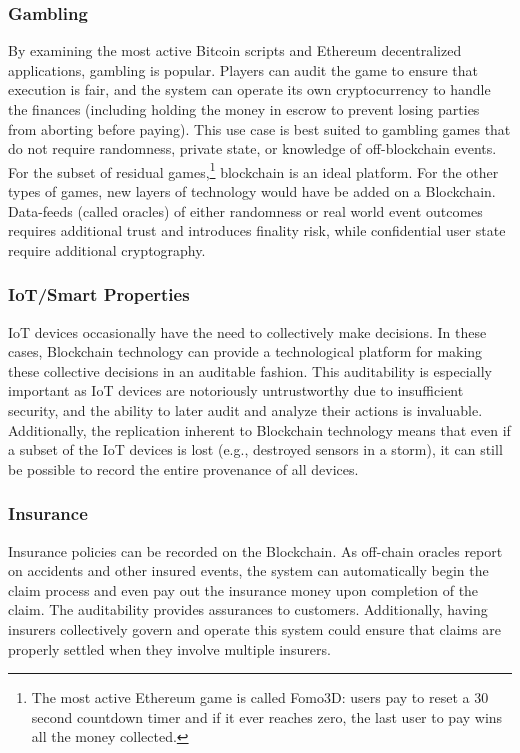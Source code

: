 \subsubsection{Gambling}
By examining the most active Bitcoin scripts and Ethereum decentralized applications, gambling is popular. Players can audit the game to ensure that execution is fair, and the system can operate its own cryptocurrency to handle the finances (including holding the money in escrow to prevent losing parties from aborting before paying). This use case is best suited to gambling games that do not require randomness, private state, or knowledge of off-blockchain events. For the subset of residual games,\footnote{The most active Ethereum game is called Fomo3D: users pay to reset a 30 second countdown timer and if it ever reaches zero, the last user to pay wins all the money collected.} blockchain is an ideal platform. For the other types of games, new layers of technology would have be added on a Blockchain. Data-feeds (called oracles) of either randomness or real world event outcomes requires additional trust and introduces finality risk, while confidential user state require additional cryptography.  


\subsubsection{IoT/Smart Properties}
IoT devices occasionally have the need to collectively make decisions.
In these cases, Blockchain technology can provide a technological platform for making these collective decisions in an auditable fashion.
This auditability is especially important as IoT devices are notoriously untrustworthy due to insufficient security, and the ability to later audit and analyze their actions is invaluable.
Additionally, the replication inherent to Blockchain technology means that even if a subset of the IoT devices is lost (e.g., destroyed sensors in a storm), it can still be possible to record the entire provenance of all devices.

\subsubsection{Insurance}
Insurance policies can be recorded on the Blockchain.
As off-chain oracles report on accidents and other insured events, the system can automatically begin the claim process and even pay out the insurance money upon completion of the claim.
The auditability provides assurances to customers.
Additionally, having insurers collectively govern and operate this system could ensure that claims are properly settled when they involve multiple insurers.

